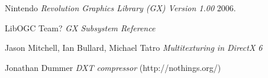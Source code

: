 \documentclass[12pt]{article}
\begin{document}
\pagebreak[4]

\begin{thebibliography}{1}

   Nintendo {\em Revolution Graphics Library (GX) Version 1.00}  2006.

   LibOGC Team? {\em GX Subsystem Reference }

   Jason Mitchell, Ian Bullard, Michael Tatro  {\em Multitexturing in DirectX 6 }
  
   Jonathan Dummer {\em DXT compressor } (http://nothings.org/)
  
\end{thebibliography}
\end{document}
